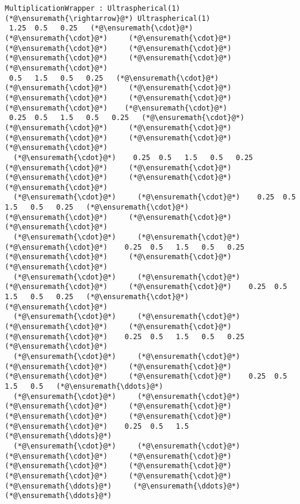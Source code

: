 \documentclass[12pt,landscape]{article}
\begin{document}
{\begin{lstlisting}
MultiplicationWrapper : Ultraspherical(1) (*@\ensuremath{\rightarrow}@*) Ultraspherical(1)
 1.25  0.5   0.25   (*@\ensuremath{\cdot}@*)     (*@\ensuremath{\cdot}@*)     (*@\ensuremath{\cdot}@*)     (*@\ensuremath{\cdot}@*)     (*@\ensuremath{\cdot}@*)     (*@\ensuremath{\cdot}@*)     (*@\ensuremath{\cdot}@*)    (*@\ensuremath{\cdot}@*)
 0.5   1.5   0.5   0.25   (*@\ensuremath{\cdot}@*)     (*@\ensuremath{\cdot}@*)     (*@\ensuremath{\cdot}@*)     (*@\ensuremath{\cdot}@*)     (*@\ensuremath{\cdot}@*)     (*@\ensuremath{\cdot}@*)    (*@\ensuremath{\cdot}@*)
 0.25  0.5   1.5   0.5   0.25   (*@\ensuremath{\cdot}@*)     (*@\ensuremath{\cdot}@*)     (*@\ensuremath{\cdot}@*)     (*@\ensuremath{\cdot}@*)     (*@\ensuremath{\cdot}@*)    (*@\ensuremath{\cdot}@*)
  (*@\ensuremath{\cdot}@*)    0.25  0.5   1.5   0.5   0.25   (*@\ensuremath{\cdot}@*)     (*@\ensuremath{\cdot}@*)     (*@\ensuremath{\cdot}@*)     (*@\ensuremath{\cdot}@*)    (*@\ensuremath{\cdot}@*)
  (*@\ensuremath{\cdot}@*)     (*@\ensuremath{\cdot}@*)    0.25  0.5   1.5   0.5   0.25   (*@\ensuremath{\cdot}@*)     (*@\ensuremath{\cdot}@*)     (*@\ensuremath{\cdot}@*)    (*@\ensuremath{\cdot}@*)
  (*@\ensuremath{\cdot}@*)     (*@\ensuremath{\cdot}@*)     (*@\ensuremath{\cdot}@*)    0.25  0.5   1.5   0.5   0.25   (*@\ensuremath{\cdot}@*)     (*@\ensuremath{\cdot}@*)    (*@\ensuremath{\cdot}@*)
  (*@\ensuremath{\cdot}@*)     (*@\ensuremath{\cdot}@*)     (*@\ensuremath{\cdot}@*)     (*@\ensuremath{\cdot}@*)    0.25  0.5   1.5   0.5   0.25   (*@\ensuremath{\cdot}@*)    (*@\ensuremath{\cdot}@*)
  (*@\ensuremath{\cdot}@*)     (*@\ensuremath{\cdot}@*)     (*@\ensuremath{\cdot}@*)     (*@\ensuremath{\cdot}@*)     (*@\ensuremath{\cdot}@*)    0.25  0.5   1.5   0.5   0.25  (*@\ensuremath{\cdot}@*)
  (*@\ensuremath{\cdot}@*)     (*@\ensuremath{\cdot}@*)     (*@\ensuremath{\cdot}@*)     (*@\ensuremath{\cdot}@*)     (*@\ensuremath{\cdot}@*)     (*@\ensuremath{\cdot}@*)    0.25  0.5   1.5   0.5   (*@\ensuremath{\ddots}@*)
  (*@\ensuremath{\cdot}@*)     (*@\ensuremath{\cdot}@*)     (*@\ensuremath{\cdot}@*)     (*@\ensuremath{\cdot}@*)     (*@\ensuremath{\cdot}@*)     (*@\ensuremath{\cdot}@*)     (*@\ensuremath{\cdot}@*)    0.25  0.5   1.5   (*@\ensuremath{\ddots}@*)
  (*@\ensuremath{\cdot}@*)     (*@\ensuremath{\cdot}@*)     (*@\ensuremath{\cdot}@*)     (*@\ensuremath{\cdot}@*)     (*@\ensuremath{\cdot}@*)     (*@\ensuremath{\cdot}@*)     (*@\ensuremath{\cdot}@*)     (*@\ensuremath{\cdot}@*)     (*@\ensuremath{\ddots}@*)     (*@\ensuremath{\ddots}@*)    (*@\ensuremath{\ddots}@*)
\end{lstlisting}


}
\end{document}
